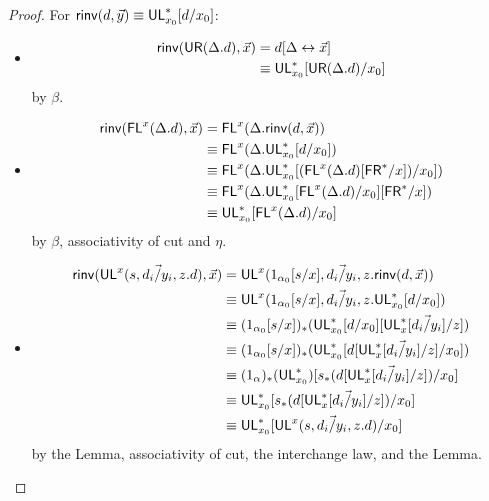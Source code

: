 \begin{proof}
For $\mathsf{rinv}(d,\vec{y}) \equiv \mathsf{UL}^*_{x_0}[d/x_0]$:
\begin{itemize}
\item \begin{align*}
\mathsf{rinv}(\mathsf{UR}(\Delta.d),\vec{x}) &= d[\Delta \leftrightarrow \vec{x}]\\
&\equiv \mathsf{UL}^*_{x_0}[\mathsf{UR}(\Delta.d)/x_0]
\end{align*}
by $\beta$.
\item \begin{align*}
\mathsf{rinv}(\mathsf{FL}^{x}(\Delta.d),\vec{x}) 
&= \mathsf{FL}^{x}(\Delta.\mathsf{rinv}(d,\vec{x})) \\
&\equiv \mathsf{FL}^{x}(\Delta.\mathsf{UL}^*_{x_0}[d/x_0]) \\
&\equiv \mathsf{FL}^{x}(\Delta.\mathsf{UL}^*_{x_0}[(\mathsf{FL}^{x}(\Delta.d)[\mathsf{FR}^*/x])/x_0]) \\
&\equiv \mathsf{FL}^{x}(\Delta.\mathsf{UL}^*_{x_0}[\mathsf{FL}^{x}(\Delta.d)/x_0][\mathsf{FR}^*/x]) \\
&\equiv \mathsf{UL}^*_{x_0}[\mathsf{FL}^{x}(\Delta.d)/x_0]
\end{align*}
by $\beta$, associativity of cut and $\eta$.
\item \begin{align*}
\mathsf{rinv}(\mathsf{UL}^{x}_{}(s,\vec{d_i/y_i},z.d),\vec{x}) 
&= \mathsf{UL}^{x}_{}(1_{\alpha_0}[s/x],\vec{d_i/y_i},z.\mathsf{rinv}(d,\vec{x}))\\
&\equiv \mathsf{UL}^{x}_{}(1_{\alpha_0}[s/x],\vec{d_i/y_i},z.\mathsf{UL}^*_{x_0}[d/x_0])\\
&\equiv (1_{\alpha_0}[s/x])_*(\mathsf{UL}^*_{x_0}[d/x_0][\mathsf{UL}^*_{x}[\vec{d_i/y_i}]/z]) \\
&\equiv (1_{\alpha_0}[s/x])_*(\mathsf{UL}^*_{x_0}[d[\mathsf{UL}^*_{x}[\vec{d_i/y_i}]/z]/x_0]) \\
&\equiv (1_\alpha)_*(\mathsf{UL}^*_{x_0})[s_*(d[\mathsf{UL}^*_{x}[\vec{d_i/y_i}]/z])/x_0] \\
&\equiv \mathsf{UL}^*_{x_0}[s_*(d[\mathsf{UL}^*_{x}[\vec{d_i/y_i}]/z])/x_0] \\
&\equiv \mathsf{UL}^*_{x_0}[\mathsf{UL}^{x}_{}(s,\vec{d_i/y_i},z.d)/x_0]
\end{align*}
by the Lemma, associativity of cut, the interchange law, and the Lemma.
\end{itemize}


\end{proof}
